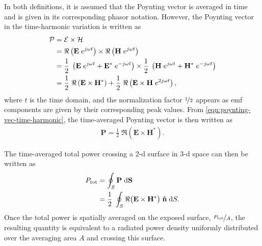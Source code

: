 In both definitions, it is assumed that the Poynting vector is averaged in time and is given in its corresponding phasor notation.
However, the Poynting vector in the time-harmonic variation is written as
\begin{align}
    \label{eqn:poynting-vec-time-harmonic}
    \mathcal{P} &= \mathcal{E} \times \mathcal{H} \notag\\
                &= \Re \left( \mathbf{E} \; e^{j \omega t} \right) \times \Re \left( \mathbf{H} \; e^{j \omega t} \right) \notag\\
                &= \frac{1}{2} \; \left( \mathbf{E} \; e^{j \omega t} + \mathbf{E}^*  \; e^{-j \omega t} \right) \times \frac{1}{2} \; \left( \mathbf{H} \; e^{j \omega t} + \mathbf{H}^*  \; e^{-j \omega t} \right) \notag\\
                &= \frac{1}{2} \; \Re \left( \mathbf{E} \times \mathbf{H}^* \right) + \frac{1}{2} \; \Re \left( \mathbf{E} \times \mathbf{H} \; e^{2j \omega t} \right), 
\end{align}
where $t$ is the time domain, and the normalization factor $\nicefrac{1}{2}$ appears as \gls{emf} components are given by their corresponding peak values.
From \cref{eqn:poynting-vec-time-harmonic}, the time-averaged Poynting vector is then written as
\begin{align}
    \label{eqn:poynting-vec-time-avg}
    \mathbf{P} = \frac{1}{2} \; \Re \left( \mathbf{E} \times \mathbf{H}^* \right).
\end{align}

The time-averaged total power crossing a \gls{2-d} surface in \gls{3-d} space can then be written as
\begin{align}
    \label{eqn:poynting-flow}
    P_\text{tot} &= \oint_S \mathbf{P} \; \mathrm{d}\mathbf{S} \notag\\
                 &= \frac{1}{2} \; \oint_S \Re \big( \mathbf{E} \times \mathbf{H}^* \big) \; \mathbf{\hat n} \; \mathrm{d}S.
\end{align}
Once the total power is spatially averaged on the exposed surface, $\nicefrac{P_\text{tot}}{A}$, the resulting quantity is equivalent to a radiated power density uniformly distributed over the averaging area $A$ and crossing this surface.

